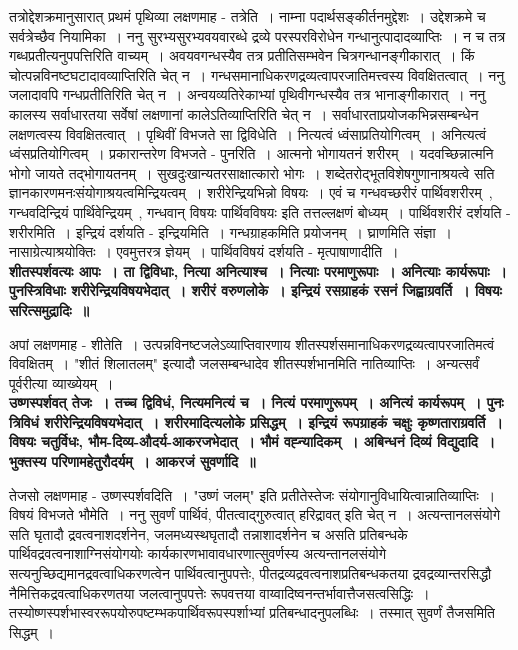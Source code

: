 		तत्रोद्देशक्रमानुसारात् प्रथमं पृथिव्या लक्षणमाह - तत्रेति~। नाम्ना पदार्थसङ्कीर्तनमुद्देशः~। उद्देशक्रमे च सर्वत्रेच्छैव नियामिका~। ननु सुरभ्यसुरभ्यवयवारब्धे द्रव्ये परस्परविरोधेन गन्धानुत्पादादव्याप्तिः~। न च तत्र गब्धप्रतीत्यनुपपत्तिरिति वाच्यम्~। अवयवगन्धस्यैव तत्र प्रतीतिसम्भवेन चित्रगन्धानङ्गीकारात्~। किं चोत्पन्नविनष्टघटादावव्याप्तिरिति चेत् न~। गन्धसमानाधिकरणद्रव्यत्वापरजातिमत्त्वस्य विवक्षितत्वात्~। ननु जलादावपि गन्धप्रतीतिरिति चेत् न~। अन्वयव्यतिरेकाभ्यां पृथिवीगन्धस्यैव तत्र भानाङ्गीकारात्~। ननु कालस्य सर्वाधारतया सर्वेषां लक्षणानां कालेऽतिव्याप्तिरिति चेत् न~। सर्वाधारताप्रयोजकभिन्नसम्बन्धेन लक्षणत्वस्य विवक्षितत्वात्~। पृथिवीं विभजते सा द्विविधेति~। नित्यत्वं ध्वंसाप्रतियोगित्वम्~। अनित्यत्वं ध्वंसप्रतियोगित्वम्~। प्रकारान्तरेण विभजते - पुनरिति~। आत्मनो भोगायतनं शरीरम्~। यदवच्छिन्नात्मनि भोगो जायते तद्भोगायतनम्~। सुखदुःखान्यतरसाक्षात्कारो भोगः~। शब्देतरोद्भूतविशेषगुणानाश्रयत्वे सति ज्ञानकारणमनःसंयोगाश्रयत्वमिन्द्रियत्वम्~। शरीरेन्द्रियभिन्नो विषयः~। एवं च गन्धवच्छरीरं पार्थिवशरीरम्~, गन्धवदिन्द्रियं पार्थिवेन्द्रियम्~, गन्धवान् विषयः पार्थिवविषयः इति तत्तल्लक्षणं बोध्यम्~। पार्थिवशरीरं दर्शयति - शरीरमिति~। इन्द्रियं दर्शयति - इन्द्रियमिति~। गन्धग्राहकमिति प्रयोजनम्~। घ्राणमिति संज्ञा~। नासाग्रेत्याश्रयोक्तिः~। एवमुत्तरत्र ज्ञेयम्~। पार्थिवविषयं दर्शयति - मृत्पाषाणादीति~।\\[10pt]
	{\bfseries शीतस्पर्शवत्यः आपः~। ता द्विविधाः, नित्या अनित्याश्च~। नित्याः परमाणुरूपाः~। अनित्याः कार्यरूपाः~। पुनस्त्रिविधाः शरीरेन्द्रियविषयभेदात्~। शरीरं वरुणलोके~। इन्द्रियं रसग्राहकं रसनं जिह्वाग्रवर्ति~। विषयः सरित्समुद्रादिः~॥}\par
		अपां लक्षणमाह - शीतेति~। उत्पन्नविनष्टजलेऽव्याप्तिवारणाय शीतस्पर्शसमानाधिकरणद्रव्यत्वापरजातिमत्वं विवक्षितम्~। "शीतं शिलातलम्" इत्यादौ जलसम्बन्धादेव शीतस्पर्शभानमिति नातिव्याप्तिः~। अन्यत्सर्वं पूर्वरीत्या व्याख्येयम्~।\\[10pt]
	{\bfseries उष्णस्पर्शवत् तेजः~। तच्च द्विविधं, नित्यमनित्यं च~। नित्यं परमाणुरूपम्~। अनित्यं कार्यरूपम्~। पुनः त्रिविधं शरीरेन्द्रियविषयभेदात्~। शरीरमादित्यलोके प्रसिद्धम्~। इन्द्रियं रूपग्राहकं चक्षुः कृष्णताराग्रवर्ति~। विषयः चतुर्विधः, भौम-दिव्य-औदर्य-आकरजभेदात्~। भौमं वह्न्यादिकम्~। अबिन्धनं दिव्यं विद्युदादि~। भुक्तस्य परिणामहेतुरौदर्यम्~। आकरजं सुवर्णादि~॥}\par
		तेजसो लक्षणमाह - उष्णस्पर्शवदिति~। "उष्णं जलम्" इति प्रतीतेस्तेजः संयोगानुविधायित्वान्नातिव्याप्तिः~। विषयं विभजते भौमेति~। ननु सुवर्णं पार्थिवं, पीतत्वाद्गुरुत्वात् हरिद्रावत् इति चेत् न~। अत्यन्तानलसंयोगे सति घृतादौ द्रवत्वनाशदर्शनेन, जलमध्यस्थघृतादौ तन्नाशादर्शनेन च असति प्रतिबन्धके पार्थिवद्रवत्वनाशाग्निसंयोगयोः कार्यकारणभावावधारणात्सुवर्णस्य अत्यन्तानलसंयोगे सत्यनुच्छिद्यमानद्रवत्वाधिकरणत्वेन पार्थिवत्वानुपपत्तेः, पीतद्रव्यद्रवत्वनाशप्रतिबन्धकतया द्रवद्रव्यान्तरसिद्धौ नैमित्तिकद्रवत्वाधिकरणतया जलत्वानुपपत्तेः रूपवत्तया वाय्वादिष्वनन्तर्भावात्तैजसत्वसिद्धिः~। तस्योष्णस्पर्शभास्वररूपयोरुपष्टम्भकपार्थिवरूपस्पर्शाभ्यां प्रतिबन्धादनुपलब्धिः~। तस्मात् सुवर्णं तैजसमिति सिद्धम्~।\\[10pt]
